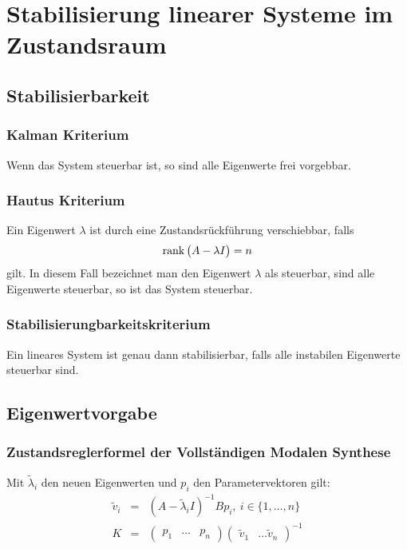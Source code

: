 \chapter{Stabilisierung linearer Systeme im Zustandsraum}
\section{Stabilisierbarkeit}
\subsection{Kalman Kriterium}
Wenn das System steuerbar ist, so sind alle Eigenwerte frei vorgebbar.

\subsection{Hautus Kriterium}
Ein Eigenwert $\lambda$ ist durch eine Zustandsrückführung verschiebbar, falls
\begin{equation}
    \operatorname*{rank} \begin{pmatrix} A-\lambda I \end{pmatrix} = n
\end{equation}
gilt. In diesem Fall bezeichnet man den Eigenwert $\lambda$ als steuerbar, sind alle Eigenwerte steuerbar,
so ist das System steuerbar.

\subsection{Stabilisierungbarkeitskriterium}
Ein lineares System ist genau dann stabilisierbar, falls alle instabilen Eigenwerte steuerbar sind.

\section{Eigenwertvorgabe}
\subsection{Zustandsreglerformel der Vollständigen Modalen Synthese}
Mit $\tilde{\lambda}_i$ den neuen Eigenwerten und $p_i$ den Parametervektoren gilt:
\begin{eqnarray}
    \tilde{v}_i &=& {(A-\tilde{\lambda}_i I)}^{-1} B p_i,\ i \in \{1, \ldots, n\} \\
    K &=& \begin{pmatrix} p_1 & \ldots & p_n \end{pmatrix}
            {\begin{pmatrix}\tilde{v}_1 & \ldots \tilde{v}_n \end{pmatrix}}^{-1}
\end{eqnarray}

